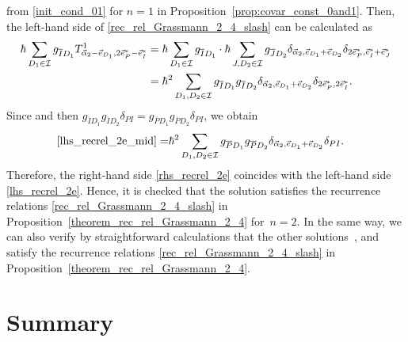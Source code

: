 \documentclass[pdftex]{sigma}
\numberwithin{equation}{section}
\begin{document}
from \eqref{init_cond_01} for $n=1$ in Proposition~\ref{prop:covar_const_0and1}. Then, the left-hand side of \eqref{rec_rel_Grassmann_2_4_slash} can be calculated as
\begin{align}
\hbar
\sum_{
D_{1}
\in
\mathcal{I}
}
g_{\overline{I}
D_{1}
}
T^{1}_{
\vec{\alpha}_{2}
-
\vec{e}_{D_{1}}
,
2
\vec{e}_{P}^{\ast}
-
\vec{e}_{I}^{\ast}
}
={}&
\hbar
\sum_{
D_{1}
\in
\mathcal{I}
}
g_{\overline{I}D_{1}}
\cdot
\hbar
\sum_{
J,D_{2}
\in
\mathcal{I}
}
g_{\overline{J}D_{2}}
\delta_{
\vec{\alpha}_{2},
\vec{e}_{D_{1}}
+
\vec{e}_{D_{2}}
}
\delta_{
2
\vec{e}_{P}^{\ast},
\vec{e}_{I}^{\ast}
+
\vec{e}_{J}^{\ast}
}
\nonumber
\\
={}&
\hbar^{2}
\sum_{
D_{1},D_{2}
\in
\mathcal{I}
}
g_{\overline{I}D_{1}}
g_{\overline{I}D_{2}}
\delta_{
\vec{\alpha}_{2},
\vec{e}_{D_{1}}
+
\vec{e}_{D_{2}}
}
\delta_{
2
\vec{e}_{P}^{\ast},
2
\vec{e}_{I}^{\ast}
}
.
\label{lhs_recrel_2e_mid}
\end{align}
Since
and then
$
g_{\overline{I}D_{1}}
g_{\overline{I}D_{2}}
\delta_{PI}
=
g_{\overline{P}D_{1}}
g_{\overline{P}D_{2}}
\delta_{PI}
$,
we obtain
\begin{align}
\eqref{lhs_recrel_2e_mid}
=&
\hbar^{2}
\sum_{
D_{1},D_{2}
\in
\mathcal{I}
}
g_{\overline{P}D_{1}}
g_{\overline{P}D_{2}}
\delta_{
\vec{\alpha}_{2},
\vec{e}_{D_{1}}
+
\vec{e}_{D_{2}}
}
\delta_{PI}.
\label{lhs_recrel_2e}
\end{align}
Therefore, the right-hand side \eqref{rhs_recrel_2e} coincides with the left-hand side \eqref{lhs_recrel_2e}. Hence, it is checked that the solution
satisfies the recurrence relations \eqref{rec_rel_Grassmann_2_4_slash} in
Proposition~\ref{theorem_rec_rel_Grassmann_2_4} for~${n=2}$. In the same way, we can also verify by straightforward calculations that the other solutions~,
and
satisfy the recurrence relations \eqref{rec_rel_Grassmann_2_4_slash} in
Proposition~\ref{theorem_rec_rel_Grassmann_2_4}.

\section{Summary}\label{G24_summary}
\end{document}
